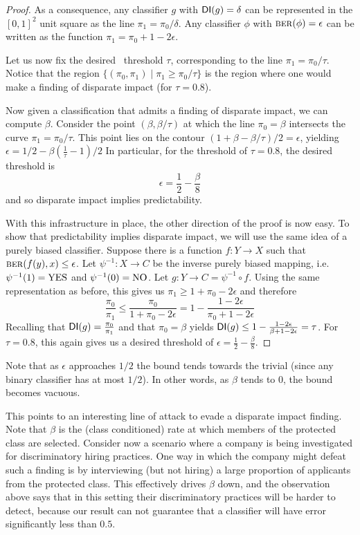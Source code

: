 \begin{proof}
As a consequence, any classifier $g$ with $\mathsf{DI}(g) = \delta$ can be represented
in the $[0,1]^2$ unit square as the line $\pi_1 = \pi_0/\delta$. Any classifier $\phi$
with $\text{\textsc{ber}}(\phi) = \epsilon$ can be written as the function $\pi_1 = \pi_0 + 1 - 2\epsilon$. 


Let us now fix the desired \di\ threshold $\tau$, corresponding to the line $\pi_1
=\pi_0/\tau$. Notice that the region $\{(\pi_0,\pi_1)\mid \pi_1 \ge \pi_0/\tau\}$ is the region
where one would make a finding of disparate impact (for $\tau = 0.8$).

Now given a classification that admits a finding of disparate impact, we can
compute $\beta$. Consider the point $(\beta, \beta/\tau)$ at which the line $\pi_0 = \beta$ intersects the
\di curve $\pi_1 = \pi_0/\tau$. This point lies on the \ber contour $(1 +
\beta-\beta/\tau)/2 = \epsilon$, yielding 
$ \epsilon = 1/2 - \beta(\frac{1}{\tau}-1)/2 $
In particular, for the \di threshold of $\tau = 0.8$, the desired \ber threshold is
\[\epsilon = \frac{1}{2} - \frac{\beta}{8} \]
and so disparate impact implies predictability.

With this infrastructure in place, the other direction of the proof is now easy.  To show that predictability implies disparate impact, we will use the same idea of a purely biased classifier.  Suppose there is a function $f \colon Y \to X$ such that $\text{\textsc{ber}}(f(y), x) \leq \epsilon$.  Let $\psi^{-1} \colon X \to C$ be the inverse purely biased mapping, i.e. $\psi^{-1}(1) = \text{YES}$ and $\psi^{-1}(0) = \text{NO}$.  Let $g \colon Y \to C = \psi^{-1} \circ f$.  Using the same representation as before, this gives us
$ \pi_1 \geq 1 + \pi_0 - 2  \epsilon$ and therefore
\[ \frac{\pi_0}{\pi_1} \leq \frac{\pi_0}{1 + \pi_0 - 2  \epsilon} = 1 - \frac{1 - 2 \epsilon}{\pi_0 + 1 - 2 \epsilon} \]
Recalling that $\mathsf{DI}(g) = \frac{\pi_0}{\pi_1}$ and that $\pi_0 = \beta$ yields
$ \mathsf{DI}(g) \leq 1 - \frac{1 - 2 \epsilon}{\beta + 1 - 2\epsilon} = \tau$.
For $\tau = 0.8$, this again gives us a desired \ber threshold of
$\epsilon = \frac{1}{2} - \frac{\beta}{8}$.
\end{proof}

Note that as $\epsilon$ approaches $1/2$ the bound tends towards
the trivial (since any binary classifier has \ber at most $1/2$). In
other words, as $\beta$ tends to $0$, the bound becomes vacuous. 

This points to an interesting line of attack to evade a disparate impact finding. Note that
$\beta$ is the (class conditioned) rate at which members of the protected class
are selected. Consider now a scenario where a company is being investigated for
discriminatory hiring practices. One way in which the company might defeat such
a finding is by interviewing (but not hiring) a large proportion of applicants
from the protected class. This effectively drives $\beta$ down, and the
observation above says that in this setting their discriminatory practices will
be harder to detect, because our result can not guarantee that a classifier will
have error significantly less than $0.5$. 

